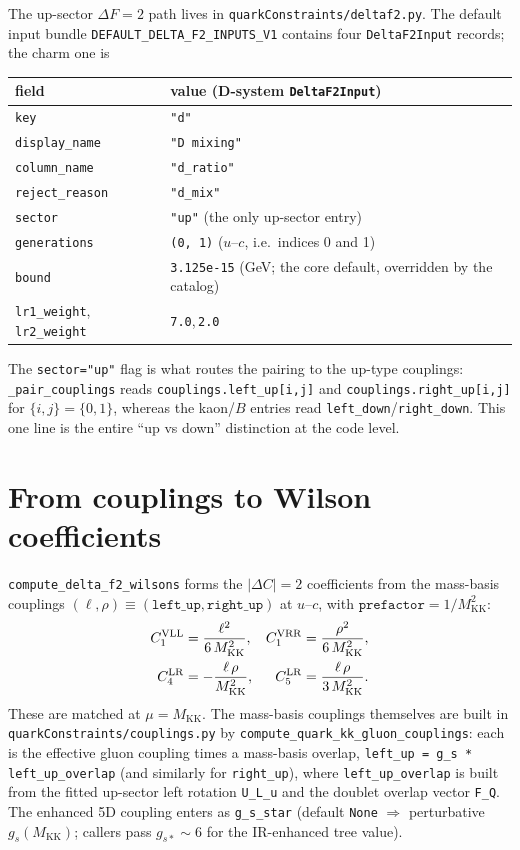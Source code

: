 \documentclass[11pt]{article}
\newcommand{\MKK}{M_{\mathrm{KK}}}
\newcommand{\code}[1]{\texttt{#1}}
\theoremstyle{definition}
\begin{document}
The up-sector $\Delta F=2$ path lives in \code{quarkConstraints/deltaf2.py}. The
default input bundle \code{DEFAULT\_DELTA\_F2\_INPUTS\_V1} contains four
\code{DeltaF2Input} records; the charm one is
\begin{center}
\begin{tabular}{ll}
\toprule
field & value (D-system \code{DeltaF2Input}) \\
\midrule
\code{key} & \code{"d"} \\
\code{display\_name} & \code{"D mixing"} \\
\code{column\_name} & \code{"d\_ratio"} \\
\code{reject\_reason} & \code{"d\_mix"} \\
\code{sector} & \code{"up"} \quad(the only up-sector entry) \\
\code{generations} & \code{(0, 1)} \quad($u$--$c$, i.e.\ indices 0 and 1) \\
\code{bound} & \code{3.125e-15} \quad(GeV; the core default, overridden by the catalog) \\
\code{lr1\_weight},\,\code{lr2\_weight} & \code{7.0},\,\code{2.0} \\
\bottomrule
\end{tabular}
\end{center}
The \code{sector="up"} flag is what routes the pairing to the up-type couplings:
\code{\_pair\_couplings} reads \code{couplings.left\_up[i,j]} and
\code{couplings.right\_up[i,j]} for $\{i,j\}=\{0,1\}$, whereas the kaon/$B$
entries read \code{left\_down}/\code{right\_down}. This one line is the entire
``up vs down'' distinction at the code level.

\section{From couplings to Wilson coefficients}
\label{sec:wilsons}

\code{compute\_delta\_f2\_wilsons} forms the $|\Delta C|=2$ coefficients from the
mass-basis couplings $(\ell,\rho)\equiv(\code{left\_up},\code{right\_up})$ at
$u$--$c$, with $\code{prefactor}=1/\MKK^2$:
\begin{align}
C_1^{\rm VLL} &= \frac{\ell^2}{6\,\MKK^2}, &
C_1^{\rm VRR} &= \frac{\rho^2}{6\,\MKK^2}, \nonumber\\
C_4^{\rm LR} &= -\frac{\ell\,\rho}{\MKK^2}, &
C_5^{\rm LR} &= \frac{\ell\,\rho}{3\,\MKK^2}.
\label{eq:codewilsons}
\end{align}
These are matched at $\mu=\MKK$. The mass-basis couplings themselves are built in
\code{quarkConstraints/couplings.py} by
\code{compute\_quark\_kk\_gluon\_couplings}: each is the effective gluon coupling
times a mass-basis overlap, \code{left\_up = g\_s * left\_up\_overlap} (and
similarly for \code{right\_up}), where \code{left\_up\_overlap} is built from the
fitted up-sector left rotation \code{U\_L\_u} and the doublet overlap vector
\code{F\_Q}. The enhanced 5D coupling enters as \code{g\_s\_star} (default
\code{None} $\Rightarrow$ perturbative $g_s(\MKK)$; callers pass
$g_{s*}\sim6$ for the IR-enhanced tree value).
\end{document}
